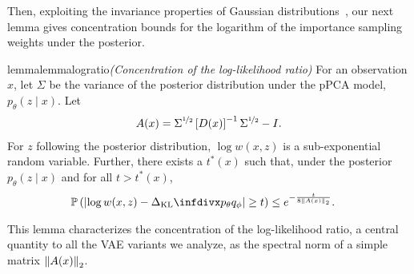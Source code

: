 Then, exploiting the invariance properties of Gaussian distributions~\cite{wainwright_2019}, our next lemma gives concentration bounds for the logarithm of the importance sampling weights under the posterior.
\begin{restatable}{lemma}{lemmalogratio}\emph{(Concentration of the log-likelihood ratio)}\label{prop:log-ratio}
For an observation $x$, let $\Sigma$ be the variance of the posterior distribution under the pPCA model, $p_\theta(z \mid x)$. Let 
\begin{align}
\label{eq:A}
    A(x) = \Sigma^{\nicefrac{1}{2}}\left[D(x)\right]^{-1}\Sigma^{\nicefrac{1}{2}} - I.
\end{align}
For $z$ following the posterior distribution, $\log w(x, z)$ is a sub-exponential random variable. Further, there exists a $t^*(x)$ such that, under the posterior $p_\theta(z \mid x)$ and for all $t>t^*(x)$,
\begin{align}
    \mathbb{P}\left(\left|\log w(x, z) - \kl{p_\theta}{q_\phi}\right| \geq t\right) & \leq e^{-\frac{t}{8\norm{A(x)}_2}}.
\end{align}
\end{restatable}
This lemma characterizes the concentration of the log-likelihood ratio, a central quantity to all the VAE variants we analyze, as the spectral norm of a simple matrix $\left\lVert A(x)\right\rVert_2$. 
